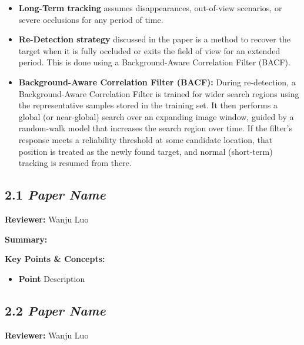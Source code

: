 \documentclass{article}
\begin{document}
\begin{itemize}
  \item \textbf{Long-Term tracking} assumes disappearances, out-of-view scenarios, or severe occlusions for any period of time.
  \item \textbf{Re-Detection strategy} discussed in the paper is a method to recover the target when it is fully occluded or exits the field of view for an extended period. This is done using a Background-Aware Correlation Filter (BACF).
  \item \textbf{Background-Aware Correlation Filter (BACF):} During re-detection, a Background-Aware Correlation Filter is trained for wider search regions using the representative samples stored in the training set. It then performs a global (or near-global) search over an expanding image window, guided by a random-walk model that increases the search region over time. If the filter's response meets a reliability threshold at some candidate location, that position is treated as the newly found target, and normal (short-term) tracking is resumed from there.
\end{itemize}

\subsection*{2.1 \textit{Paper Name}}

\hspace*{\parindent}\textbf{Reviewer:} Wanju Luo

\vspace{0.3cm}

\textbf{Summary:}

\vspace{0.3cm}

\textbf{Key Points \& Concepts:}
\begin{itemize}
  \item \textbf{Point} Description
\end{itemize}

\subsection*{2.2 \textit{Paper Name}}

\hspace*{\parindent}\textbf{Reviewer:} Wanju Luo

\vspace{0.3cm}
\end{document}
